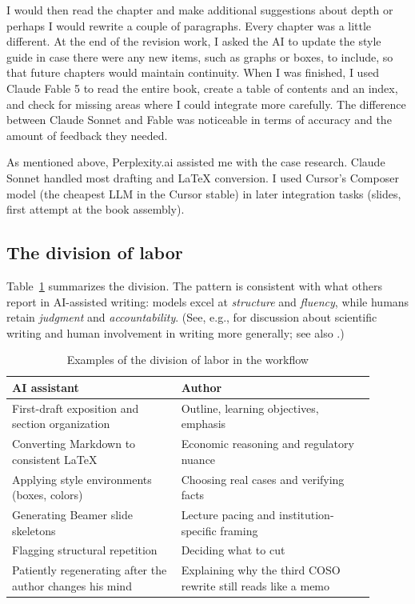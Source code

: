 \documentclass[11pt,letterpaper]{article}
\begin{document}
I would then read the chapter and make additional suggestions about depth or perhaps I would rewrite a couple of paragraphs. Every chapter was a little different. At the end of the revision work, I asked the AI to update the style guide in case there were any new items, such as graphs or boxes, to include, so that future chapters would maintain continuity. When I was finished, I used Claude Fable 5 to read the entire book, create a table of contents and an index, and check for missing areas where I could integrate more carefully. The difference between Claude Sonnet and Fable was noticeable in terms of accuracy and the amount of feedback they needed.

As mentioned above, Perplexity.ai assisted me with the case research. Claude Sonnet handled most drafting and LaTeX conversion. I used Cursor's Composer model (the cheapest LLM in the Cursor stable) in later integration tasks (slides, first attempt at the book assembly).  

\subsection{The division of labor}

Table~\ref{tab:division} summarizes the division. The pattern is consistent with what others report in AI-assisted writing: models excel at \emph{structure} and \emph{fluency}, while humans retain \emph{judgment} and \emph{accountability}. (See, e.g., \cite{Minkel2025, EAET2026} for discussion about scientific writing and human involvement in writing more generally; see also \cite{reinhart2025human}.)

\begin{table}[htbp]
  \centering
  \caption{Examples of the division of labor in the workflow}
  \label{tab:division}
  \small
  \begin{tabular}{@{}p{0.42\linewidth}p{0.48\linewidth}@{}}
    \toprule
    \textbf{AI assistant} & \textbf{Author} \\
    \midrule
    First-draft exposition and section organization & Outline, learning objectives, emphasis \\
    Converting Markdown to consistent LaTeX & Economic reasoning and regulatory nuance \\
    Applying style environments (boxes, colors) & Choosing real cases and verifying facts \\
    Generating Beamer slide skeletons & Lecture pacing and institution-specific framing \\
    Flagging structural repetition & Deciding what to cut \\
    Patiently regenerating after the author changes his mind  & Explaining why the third COSO rewrite still reads like a memo \\
    \bottomrule
  \end{tabular}
\end{table}
\end{document}
